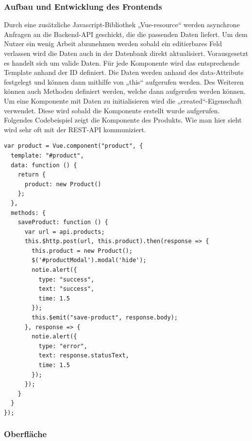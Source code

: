 \subsubsection{Aufbau und Entwicklung des Frontends}  
\label{sec:Aufbau und Entwicklung des Frontends-1}

Durch eine zusätzliche Javascript-Bibliothek „Vue-resource“ werden asynchrone Anfragen an die Backend-API geschickt, die die passenden Daten liefert. Um dem Nutzer ein wenig Arbeit abzunehmen werden sobald ein editierbares Feld verlassen wird die Daten auch in der Datenbank direkt aktualisiert. Vorausgesetzt es handelt sich um valide Daten.
Für jede Komponente wird das entsprechende Template anhand der ID definiert.
Die Daten werden anhand des data-Attributs festgelegt und können dann mithilfe von „this“ aufgerufen werden. 
Des Weiteren können auch Methoden definiert werden, welche dann aufgerufen werden können. Um eine Komponente mit Daten zu initialisieren wird die „created“-Eigenschaft verwendet. Diese wird sobald die Komponente erstellt wurde aufgerufen. Folgendes Codebeispiel zeigt die Komponente des Produkts. Wie man hier sieht wird sehr oft mit der REST-API kommuniziert.

\begin{lstlisting}[frame=single]
var product = Vue.component("product", {
  template: "#product",
  data: function () {
    return {
      product: new Product()
    };
  },
  methods: {
    saveProduct: function () {
      var url = api.products;
      this.$http.post(url, this.product).then(response => {
        this.product = new Product();
        $('#productModal').modal('hide');
        notie.alert({
          type: "success",
          text: "success",
          time: 1.5
        });
        this.$emit("save-product", response.body);
      }, response => {
        notie.alert({
          type: "error",
          text: response.statusText,
          time: 1.5
        });
      });
    }
  }
});
\end{lstlisting}

\clearpage

\subsubsection{Oberfläche}  
\label{sec:Oberfläche-1}

